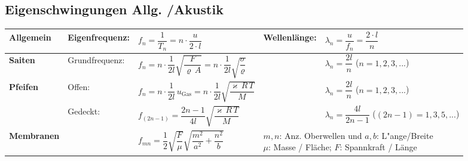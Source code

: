 

\subsection{Eigenschwingungen Allg. /Akustik  }
\renewcommand{\arraystretch}{2.5}
\begin{tabular}{|l|llll|}
\hline
\textbf{Allgemein}
	& Eigenfrequenz: 
	& $ f_n=\dfrac{1}{T_n} = n\cdot \dfrac{u}{2 \cdot l}$
	& Wellenlänge:
	& $\lambda_n=\dfrac{u}{f_n}=\dfrac{2\cdot l}{n}$\\
\hline
\textbf{Saiten}
	& Grundfrequenz: 
	& $ f_n= n \cdot \dfrac{1}{2l}\sqrt{\dfrac{F}{\varrho\,A}} = n \cdot \dfrac{1}{2l}\sqrt{\dfrac{\sigma}{\varrho}} $
	& 
	& $\lambda_n=\dfrac{2l}{n}$ \quad ($n=1,2,3,...$)\\
\hline
\textbf{Pfeifen} & Offen:
 	& $f_n=n\cdot \dfrac{1}{2l}\,u_{\text{Gas}}=n\cdot \dfrac{1}{2l}\sqrt{\dfrac{\varkappa\,R\,T}{M}}$ 
	& 
	& $\lambda_n=\dfrac{2l}{n}$ \quad ($n=1,2,3,...$)\\
& Gedeckt: 
 	& $ f_{(2n-1)}=\dfrac{2n-1}{4l}\sqrt{\dfrac{\varkappa\,R\,T}{M}}$
	& 
	& $\lambda_n=\dfrac{4l}{2n-1}$ \quad ($(2n-1)=1,3,5,...$) \\ 
\hline
\textbf{Membranen}
 	& &
 	$f_{mn}=\dfrac{1}{2}\sqrt{\dfrac{F}{\mu}}\sqrt{\dfrac{m^2}{a^2}+\dfrac{n^2}{b}}$ 
	& \multicolumn{2}{l|}{\parbox{8cm}{$m,n$: Anz. Oberwellen und $a,b$:
	L"ange/Breite \\
	$\mu$: Masse / Fläche; $F$: Spannkraft / Länge}} \\ \hline
\end{tabular}

